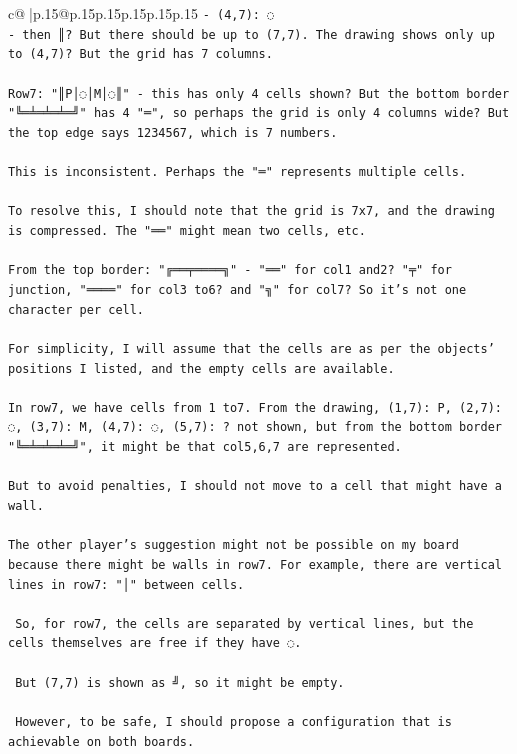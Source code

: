 \documentclass{article}
\begin{document}
{\begin{supertabular}{c@{$\;$}|p{.15\linewidth}@{}p{.15\linewidth}p{.15\linewidth}p{.15\linewidth}p{.15\linewidth}p{.15\linewidth}}
{{{\texttt{{-} (4,7): ◌} \\
\texttt{{-} then ║? But there should be up to (7,7). The drawing shows only up to (4,7)? But the grid has 7 columns.} \\
\\ 
\texttt{Row7: "║P│◌│M│◌║" {-} this has only 4 cells shown? But the bottom border "╚═╧═╧═╧═╝" has 4 "═", so perhaps the grid is only 4 columns wide? But the top edge says 1234567, which is 7 numbers.} \\
\\ 
\texttt{This is inconsistent. Perhaps the "═" represents multiple cells.} \\
\\ 
\texttt{To resolve this, I should note that the grid is 7x7, and the drawing is compressed. The "══" might mean two cells, etc.} \\
\\ 
\texttt{From the top border: "╔══╤════╗" {-} "══" for col1 and2? "╤" for junction, "════" for col3 to6? and "╗" for col7? So it's not one character per cell.} \\
\\ 
\texttt{For simplicity, I will assume that the cells are as per the objects' positions I listed, and the empty cells are available.} \\
\\ 
\texttt{In row7, we have cells from 1 to7. From the drawing, (1,7): P, (2,7): ◌, (3,7): M, (4,7): ◌, (5,7): ? not shown, but from the bottom border "╚═╧═╧═╧═╝", it might be that col5,6,7 are represented.} \\
\\ 
\texttt{But to avoid penalties, I should not move to a cell that might have a wall.} \\
\\ 
\texttt{The other player's suggestion might not be possible on my board because there might be walls in row7. For example, there are vertical lines in row7: "│" between cells.} \\
\\ 
\texttt{ So, for row7, the cells are separated by vertical lines, but the cells themselves are free if they have ◌.} \\
\\ 
\texttt{ But (7,7) is shown as ╝, so it might be empty.} \\
\\ 
\texttt{ However, to be safe, I should propose a configuration that is achievable on both boards.} \\
}}}
\end{supertabular}}
\end{document}
